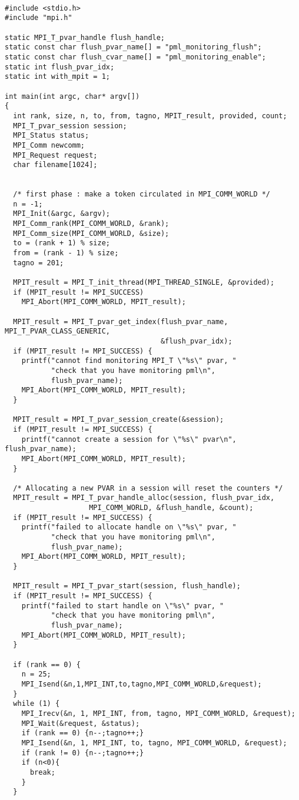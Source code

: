 \documentclass[notitlepage]{article}
\begin{document}
\begin{verbatim}
  
#include <stdio.h>
#include "mpi.h"

static MPI_T_pvar_handle flush_handle;
static const char flush_pvar_name[] = "pml_monitoring_flush";
static const char flush_cvar_name[] = "pml_monitoring_enable";
static int flush_pvar_idx;
static int with_mpit = 1;

int main(int argc, char* argv[])
{
  int rank, size, n, to, from, tagno, MPIT_result, provided, count;
  MPI_T_pvar_session session;
  MPI_Status status;
  MPI_Comm newcomm;
  MPI_Request request;
  char filename[1024];


  /* first phase : make a token circulated in MPI_COMM_WORLD */
  n = -1;
  MPI_Init(&argc, &argv);
  MPI_Comm_rank(MPI_COMM_WORLD, &rank);
  MPI_Comm_size(MPI_COMM_WORLD, &size);
  to = (rank + 1) % size;
  from = (rank - 1) % size;
  tagno = 201;

  MPIT_result = MPI_T_init_thread(MPI_THREAD_SINGLE, &provided);
  if (MPIT_result != MPI_SUCCESS)
    MPI_Abort(MPI_COMM_WORLD, MPIT_result);

  MPIT_result = MPI_T_pvar_get_index(flush_pvar_name, MPI_T_PVAR_CLASS_GENERIC, 
                                     &flush_pvar_idx);
  if (MPIT_result != MPI_SUCCESS) {
    printf("cannot find monitoring MPI_T \"%s\" pvar, "
           "check that you have monitoring pml\n",
           flush_pvar_name);
    MPI_Abort(MPI_COMM_WORLD, MPIT_result);
  }

  MPIT_result = MPI_T_pvar_session_create(&session);
  if (MPIT_result != MPI_SUCCESS) {
    printf("cannot create a session for \"%s\" pvar\n", flush_pvar_name);
    MPI_Abort(MPI_COMM_WORLD, MPIT_result);
  }

  /* Allocating a new PVAR in a session will reset the counters */
  MPIT_result = MPI_T_pvar_handle_alloc(session, flush_pvar_idx,
					MPI_COMM_WORLD, &flush_handle, &count);
  if (MPIT_result != MPI_SUCCESS) {
    printf("failed to allocate handle on \"%s\" pvar, "
           "check that you have monitoring pml\n",
           flush_pvar_name);
    MPI_Abort(MPI_COMM_WORLD, MPIT_result);
  }

  MPIT_result = MPI_T_pvar_start(session, flush_handle);
  if (MPIT_result != MPI_SUCCESS) {
    printf("failed to start handle on \"%s\" pvar, "
           "check that you have monitoring pml\n",
           flush_pvar_name);
    MPI_Abort(MPI_COMM_WORLD, MPIT_result);
  }

  if (rank == 0) {
    n = 25;
    MPI_Isend(&n,1,MPI_INT,to,tagno,MPI_COMM_WORLD,&request);
  }
  while (1) {
    MPI_Irecv(&n, 1, MPI_INT, from, tagno, MPI_COMM_WORLD, &request);
    MPI_Wait(&request, &status);
    if (rank == 0) {n--;tagno++;}
    MPI_Isend(&n, 1, MPI_INT, to, tagno, MPI_COMM_WORLD, &request);
    if (rank != 0) {n--;tagno++;}
    if (n<0){
      break;
    }
  }


\end{verbatim}
\end{document}
